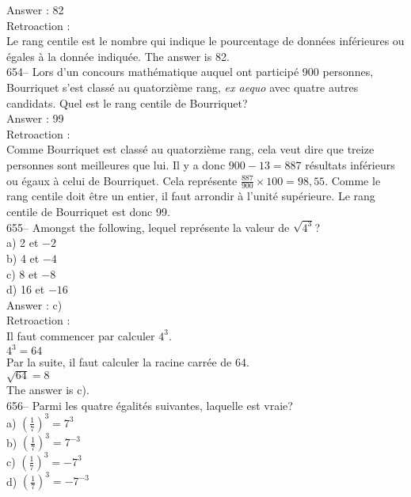 ﻿\documentclass[letterpaper, 12pt]{article}
\begin{document}
Answer : 82\\

Retroaction : \\
Le rang centile est le nombre qui indique le pourcentage de donn\'ees
inf\'erieures ou \'egales \`a la donn\'ee indiqu\'ee.  The answer is
82.\\

654--  Lors d'un concours math\'ematique auquel ont particip\'e 900
personnes, Bourriquet s'est class\'e au quatorzi\`eme rang, \emph{ex aequo}
avec quatre autres candidats.  Quel est le rang centile de Bourriquet?\\

Answer : 99\\

Retroaction : \\
Comme Bourriquet est class\'e au quatorzi\`eme rang, cela veut dire que
treize personnes sont meilleures que lui.  Il y a donc $900-13=887$
r\'esultats inf\'erieurs ou \'egaux \`a celui de Bourriquet.  Cela
repr\'esente $\frac{887}{900}\times100=98,55$.  Comme le rang centile doit
\^etre un entier, il faut arrondir \`a l'unit\'e sup\'erieure.  Le rang
centile de Bourriquet est donc 99.\\


655-- Amongst the following, lequel repr\'esente la valeur de
$\sqrt{4^{3}}$?\\
a) 2 et $-2$\\
b) 4 et $-4$\\
c) 8 et $-8$\\
d) 16 et $-16$\\

Answer : c)\\

Retroaction : \\
Il faut commencer par calculer $4^{3}$.\\
$4^{3}=64$\\
Par la suite, il faut calculer la racine carr\'ee de 64.\\
$\sqrt{64}= 8$\\
The answer is c).\\

656-- Parmi les quatre \'egalit\'es suivantes, laquelle est vraie?\\
a) $(\frac{1}{7})^{3}=7^{3}$\\[2mm]
b) $(\frac{1}{7})^{3}=7^{-3}$\\[2mm]
c) $(\frac{1}{7})^{3}=-7^{3}$\\[2mm]
d) $(\frac{1}{7})^{3}=-7^{-3}$\\
\end{document}
